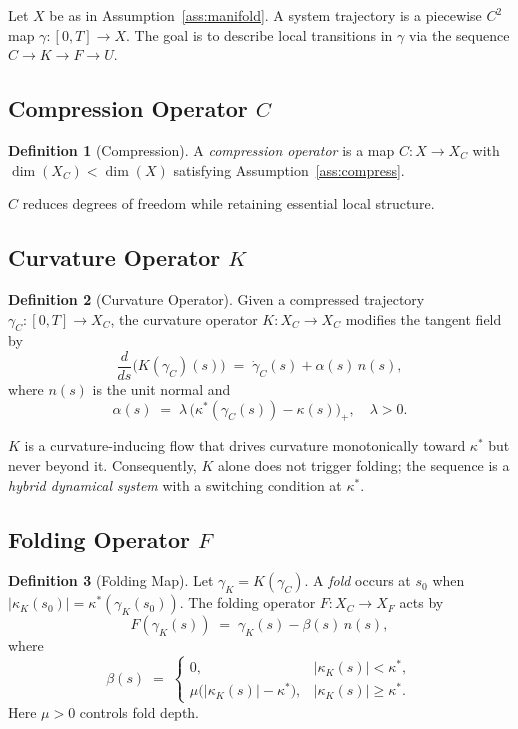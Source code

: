 \documentclass[12pt, oneside]{book}
\theoremstyle{plain}
\theoremstyle{definition}
\newtheorem{definition}{Definition}[section]
\theoremstyle{remark}
\begin{document}
Let $X$ be as in Assumption~\ref{ass:manifold}. A system trajectory
is a piecewise $C^2$ map $\gamma : [0,T] \to X$. The goal is to
describe local transitions in $\gamma$ via the sequence
$C \to K \to F \to U$.

\subsection{Compression Operator \texorpdfstring{$C$}{C}}

\begin{definition}[Compression]
A \emph{compression operator} is a map $C : X \to X_C$ with
$\dim(X_C) < \dim(X)$ satisfying Assumption~\ref{ass:compress}.
\end{definition}

$C$ reduces degrees of freedom while retaining essential local
structure.

\subsection{Curvature Operator \texorpdfstring{$K$}{K}}

\begin{definition}[Curvature Operator]
Given a compressed trajectory $\gamma_C : [0,T] \to X_C$, the
curvature operator $K : X_C \to X_C$ modifies the tangent field by
\[
\frac{d}{ds}\bigl(K(\gamma_C)(s)\bigr)
\;=\; \dot\gamma_C(s) + \alpha(s)\,n(s),
\]
where $n(s)$ is the unit normal and
\[
\alpha(s) \;=\; \lambda\,\bigl(\kappa^*(\gamma_C(s))
  - \kappa(s)\bigr)_+, \quad \lambda > 0.
\]
\end{definition}

$K$ is a curvature-inducing flow that drives curvature monotonically
toward $\kappa^*$ but never beyond it. Consequently, $K$ alone does
not trigger folding; the sequence is a \emph{hybrid dynamical system}
with a switching condition at $\kappa^*$.

\subsection{Folding Operator \texorpdfstring{$F$}{F}}

\begin{definition}[Folding Map]
Let $\gamma_K = K(\gamma_C)$. A \emph{fold} occurs at $s_0$ when
$|\kappa_K(s_0)| = \kappa^*(\gamma_K(s_0))$. The folding operator
$F : X_C \to X_F$ acts by
\[
F(\gamma_K(s)) \;=\; \gamma_K(s) - \beta(s)\,n(s),
\]
where
\[
\beta(s) \;=\;
\begin{cases}
0, & |\kappa_K(s)| < \kappa^*, \\
\mu\bigl(|\kappa_K(s)| - \kappa^*\bigr), & |\kappa_K(s)| \ge \kappa^*.
\end{cases}
\]
Here $\mu > 0$ controls fold depth.
\end{definition}
\end{document}
